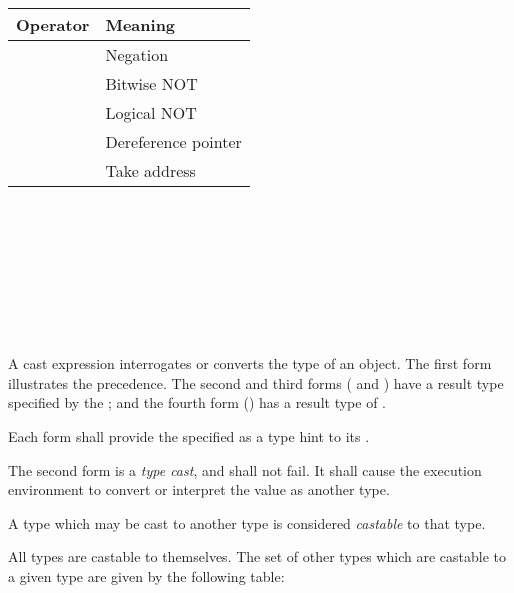
\begin{tabular}{r | l }
Operator & Meaning \\
\hline
\terminal{-} & Negation \\
\terminal{\textasciitilde} & Bitwise NOT \\
\terminal{!} & Logical NOT \\
\terminal{*} & Dereference pointer \\
\terminal{\&} & Take address \\
\end{tabular}


\begin{grammar}
 \\
	 \\
	 \terminal{:}  \\
	   \\
	   \\

 \\
	 \\
\end{grammar}

\specsubsubitem
A cast expression interrogates or converts the type of an object. The first
form illustrates the precedence. The second and third forms (\terminal{:} and
) have a result type specified by the ; and the
fourth form () has a result type of .

\specsubsubitem
Each form shall provide the specified  as a type hint to its
.

\specsubsubitem
The second form is a \textit{type cast}, and shall not fail. It shall cause the
execution environment to convert or interpret the value as another type.

\specsubsubitem
A type which may be cast to another type is considered \textit{castable} to
that type.

\specsubsubitem
All types are castable to themselves. The set of other types which are castable
to a given type are given by the following table:

